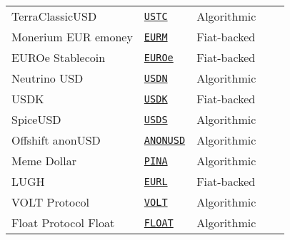 \begin{tabular}{lllll}
TerraClassicUSD & \href{https://etherscan.io/address/0xa47c8bf37f92aBed4A126BDA807A7b7498661acD}{\tt USTC} & Algorithmic \\
Monerium EUR emoney & \href{https://etherscan.io/address/0x3231Cb76718CDeF2155FC47b5286d82e6eDA273f}{\tt EURM} & Fiat-backed \\
EUROe Stablecoin & \href{https://etherscan.io/address/0x820802Fa8a99901F52e39acD21177b0BE6EE2974}{\tt EUROe} & Fiat-backed \\
Neutrino USD & \href{https://etherscan.io/address/0x674C6Ad92Fd080e4004b2312b45f796a192D27a0}{\tt USDN} & Algorithmic \\
USDK & \href{https://etherscan.io/address/0x1c48f86ae57291F7686349F12601910BD8D470bb}{\tt USDK} & Fiat-backed \\
SpiceUSD & \href{https://etherscan.io/address/0x45fDb1b92a649fb6A64Ef1511D3Ba5Bf60044838}{\tt USDS} & Algorithmic \\
Offshift anonUSD & \href{https://etherscan.io/address/0x5a7E6C8204A1359DB9AAcab7bA5Fc309B7981eFd}{\tt ANONUSD} & Algorithmic \\
Meme Dollar & \href{https://etherscan.io/address/0x02814F435dD04e254Be7ae69F61FCa19881a780D}{\tt PINA} & Algorithmic \\
LUGH & \href{https://etherscan.io/address/0xA967Dd943B336680540011536E7D8c3d33333515}{\tt EURL} & Fiat-backed \\
VOLT Protocol & \href{https://etherscan.io/address/0x559eBC30b0E58a45Cc9fF573f77EF1e5eb1b3E18}{\tt VOLT} & Algorithmic \\
Float Protocol Float & \href{https://etherscan.io/address/0xb05097849BCA421A3f51B249BA6CCa4aF4b97cb9}{\tt FLOAT} & Algorithmic \\
\bottomrule
\end{tabular}
